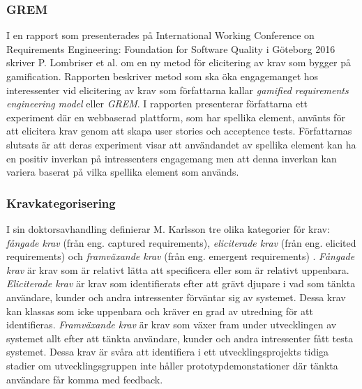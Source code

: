\subsubsection{GREM}
I en rapport som presenterades på International Working Conference on Requirements Engineering: Foundation for Software Quality i Göteborg 2016 skriver P. Lombriser et al. \cite{lombriser2016gamified} om en ny metod för elicitering av krav som bygger på gamification. Rapporten beskriver metod som ska öka engagemanget hos interessenter vid elicitering av krav som författarna kallar \textit{gamified requirements engineering model} eller \textit{GREM}. I rapporten presenterar författarna ett experiment där en webbaserad plattform, som har spellika element, använts för att elicitera krav genom att skapa user stories och acceptence tests. Författarnas slutsats är att deras experiment visar att användandet av spellika element kan ha en positiv inverkan på intressenters engagemang men att denna inverkan kan variera baserat på vilka spellika element som används.

\subsubsection{Kravkategorisering}
I sin doktorsavhandling definierar M. Karlsson tre olika kategorier för krav: \textit{fångade krav} (från eng. captured requirements), \textit{eliciterade krav} (från eng. elicited requirements) och \textit{framväxande krav} (från eng. emergent requirements) \cite{lkp.26083619960101}. \textit{Fångade krav} är krav som är relativt lätta att specificera eller som är relativt uppenbara. \textit{Eliciterade krav} är krav som identifierats efter att grävt djupare i vad som tänkta användare, kunder och andra intressenter förväntar sig av systemet. Dessa krav kan klassas som icke uppenbara och kräver en grad av utredning för att identifieras. \textit{Framväxande krav} är krav som växer fram under utvecklingen av systemet allt efter att tänkta användare, kunder och andra intressenter fått testa systemet. Dessa krav är svåra att identifiera i ett utvecklingsprojekts tidiga stadier om utvecklingsgruppen inte håller prototypdemonstationer där tänkta användare får komma med feedback. 
 
